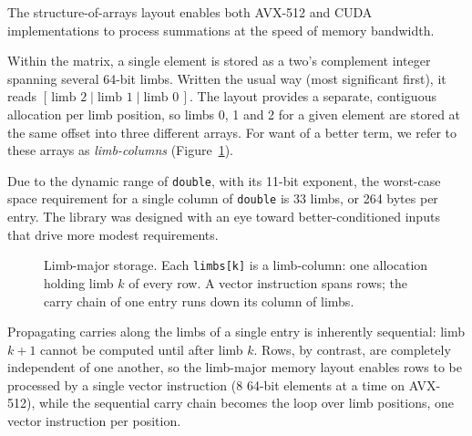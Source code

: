 \documentclass[acmsmall,screen,review]{acmart}
\newcommand{\code}[1]{\texttt{#1}}
\begin{document}
The structure-of-arrays layout enables both AVX-512 and CUDA implementations to process summations at the speed of memory bandwidth.

Within the matrix, a single element is stored as a two's complement integer spanning several 64-bit limbs. Written the usual way (most significant first), it reads $[\,\text{limb 2} \mid \text{limb 1} \mid \text{limb 0}\,]$. The layout provides a separate, contiguous allocation per limb position, so limbs 0, 1 and 2 for a given element are stored at the same offset into three different arrays. For want of a better term, we refer to these arrays as \emph{limb-columns} (Figure~\ref{fig:layout}).

Due to the dynamic range of \code{double}, with its 11-bit exponent, the worst-case space requirement for a single column of \code{double} is 33 limbs, or 264 bytes per entry. The library was designed with an eye toward better-conditioned inputs that drive more modest requirements.

\begin{figure}[t]
\centering
{}
\caption{Limb-major storage. Each \code{limbs[k]} is a limb-column: one allocation holding limb $k$ of every row. A vector instruction spans rows; the carry chain of one entry runs down its column of limbs.}
\label{fig:layout}
\end{figure}

Propagating carries along the limbs of a single entry is inherently sequential: limb $k+1$ cannot be computed until after limb $k$. Rows, by contrast, are completely independent of one another, so the limb-major memory layout enables rows to be processed by a single vector instruction (8 64-bit elements at a time on AVX-512), while the sequential carry chain becomes the loop over limb positions, one vector instruction per position.
\end{document}
